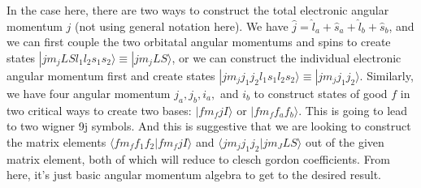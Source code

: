 \documentclass[prl, longbibliography]{revtex4-2}
\begin{document}
In the case here, there are two ways to construct the total electronic angular momentum $j$ (not using general notation here). We have $\hat{j}=\hat{l}_a+\hat{s}_a+\hat{l}_b+\hat{s}_b$, and we can first couple the two orbitatal angular momentums and spins to create states $|jm_j L S l_1 l_2 s_1 s_2 \rangle\equiv|j m_j L S\rangle$, or we can construct the individual electronic angular momentum first and create states $|j m_j j_1 j_2 l_1 s_1 l_2 s_2\rangle\equiv|j m_j j_1 j_2\rangle$. Similarly, we have four angular momentum $j_a, j_b, i_a, $ and $i_b$ to construct states of good $f$ in two critical ways to create two bases: $|f m_f j I\rangle$ or $|f m_f f_a f_b\rangle$. This is going to lead to two wigner 9j symbols. And this is suggestive that we are looking to construct the matrix elements $\langle f m_f f_1 f_2 | f m_f j I\rangle$ and $\langle j m_j j_1 j_2| j m_J L S\rangle$ out of the given matrix element, both of which will reduce to clesch gordon coefficients. From here, it's just basic angular momentum algebra to get to the desired result. 
\end{document}
